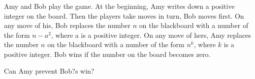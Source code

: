 Amy and Bob play the game. At the beginning, Amy writes down a positive integer on the board. Then the players take moves in turn, Bob moves first. On any move of his, Bob replaces the number $n$ on the blackboard with a number of the form $n-a^2$, where a is a positive integer. On any move of hers, Amy replaces the number $n$ on the blackboard with a number of the form $n^k$, where $k$ is a positive integer. Bob wins if the number on the board becomes zero.

Can Amy prevent Bob?s win?